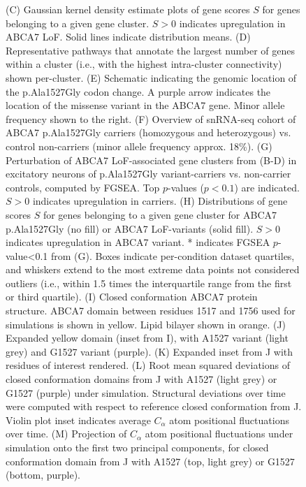 \begin{figure}[ht]
{        (C) Gaussian kernel density estimate plots of gene scores $S$ for genes belonging to a given gene cluster. $S>0$ indicates upregulation in ABCA7 LoF. Solid lines indicate distribution means.
        (D) Representative pathways that annotate the largest number of genes within a cluster (i.e., with the highest intra-cluster connectivity) shown per-cluster. 
        (E) Schematic indicating the genomic location of the p.Ala1527Gly codon change. A purple arrow indicates the location of the missense variant in the ABCA7 gene. Minor allele frequency shown to the right. 
        (F) Overview of snRNA-seq cohort of ABCA7 p.Ala1527Gly carriers (homozygous and heterozygous) vs. control non-carriers (minor allele frequency approx. 18\%).
        (G) Perturbation of ABCA7 LoF-associated gene clusters from (B-D) in excitatory neurons of p.Ala1527Gly variant-carriers vs. non-carrier controls, computed by FGSEA. Top $p$-values ($p<0.1$) are indicated. $S>0$ indicates upregulation in carriers.
        (H) Distributions of gene scores $S$ for genes belonging to a given gene cluster for ABCA7 p.Ala1527Gly (no fill) or ABCA7 LoF-variants (solid fill). $S>0$ indicates upregulation in ABCA7 variant. * indicates FGSEA $p$-value<0.1 from (G). Boxes indicate per-condition dataset quartiles, and whiskers extend to the most extreme data points not considered outliers (i.e., within 1.5 times the interquartile range from the first or third quartile).
        (I) Closed conformation ABCA7 protein structure. ABCA7 domain between residues 1517 and 1756 used for simulations is shown in yellow. Lipid bilayer shown in orange.
        (J) Expanded yellow domain (inset from I), with A1527 variant (light grey) and G1527 variant (purple).
        (K) Expanded inset from J with residues of interest rendered.
        (L) Root mean squared deviations of closed conformation domains from J with A1527 (light grey) or G1527 (purple) under simulation. Structural deviations over time were computed with respect to reference closed conformation from J. Violin plot inset indicates average $C_\alpha$ atom positional fluctuations over time.
        (M) Projection of $C_\alpha$ atom positional fluctuations under simulation onto the first two principal components, for closed conformation domain from J with A1527 (top, light grey) or G1527 (bottom, purple). 
    }
    \label{fig:main_neurons}
\end{figure}
